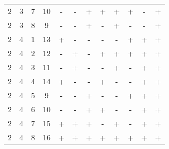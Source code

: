 \begin{table}[hbtp]
\begin{tabular}{cccccccccccc}
  2 & 3 & 7 & 10 & - & - & + & + & + & + & - & + \\ 
  2 & 3 & 8 & 9 & - & - & + & - & + & - & - & + \\ 
  2 & 4 & 1 & 13 & + & - & - & - & - & + & + & + \\ 
  2 & 4 & 2 & 12 & - & + & - & + & + & + & + & + \\ 
  2 & 4 & 3 & 11 & - & + & - & - & + & - & + & + \\ 
  2 & 4 & 4 & 14 & + & - & - & + & - & - & + & + \\ 
  2 & 4 & 5 & 9 & - & - & + & - & - & + & + & + \\ 
  2 & 4 & 6 & 10 & - & - & + & + & - & - & + & + \\ 
  2 & 4 & 7 & 15 & + & + & + & - & + & - & + & + \\ 
  2 & 4 & 8 & 16 & + & + & + & + & + & + & + & + \\ 
   \bottomrule
\end{tabular}
\end{table}
